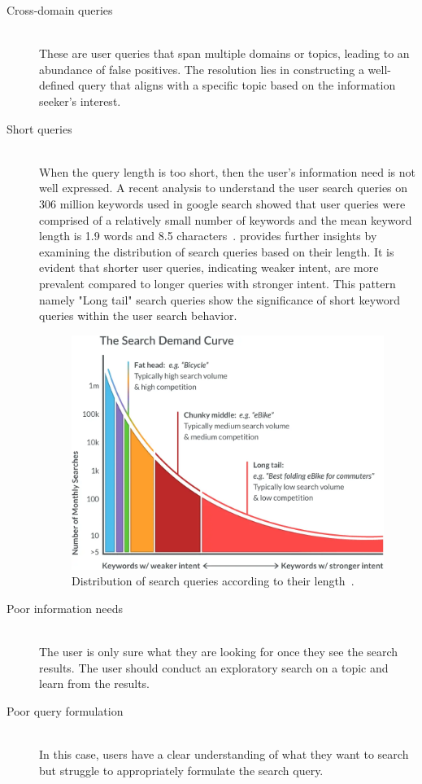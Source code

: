 \begin{description}
	\item[Cross-domain queries] \hfill \\ These are user queries that span multiple domains or topics, leading to an abundance of false positives. The resolution lies in constructing a well-defined query that aligns with a specific topic based on the information seeker's interest.
	
	\item[Short queries] \hfill \\ When the query length is too short, then the user's information need is not well expressed. A recent analysis to understand the user search queries on 306 million keywords used in google search showed that user queries were comprised of a relatively small number of keywords and the mean keyword length is 1.9 words and 8.5 characters~\cite{google_keyword}.  provides further insights by examining the distribution of search queries based on their length. It is evident that shorter user queries, indicating weaker intent, are more prevalent compared to longer queries with stronger intent. This pattern namely "Long tail" search queries show the significance of short keyword queries within the user search behavior.
	
	\begin{figure}[h]
		\centering
		\includegraphics[width=.55\textwidth]{images/outside/search_demand_curve.png}
		\caption[Search query distribution]{Distribution of search queries according to their length~\cite{mozWhatKeywords}. \label{fig:longtail_keywords}}
	\end{figure} 
	
	\item[Poor information needs] \hfill \\ The user is only sure what they are looking for once they see the search results. The user should conduct an exploratory search on a topic and learn from the results.
	
	\item[Poor query formulation] \hfill \\ In this case, users have a clear understanding of what they want to search but struggle to appropriately formulate the search query.
\end{description}

